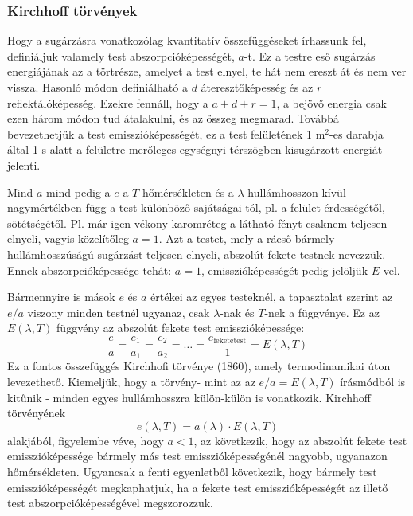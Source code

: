 \documentclass[../main.tex]{subfiles}
\begin{document}
\subsubsection{Kirchhoff törvények}
Hogy a sugárzásra vonatkozólag kvantitatív összefüggéseket írhassunk fel, definiáljuk valamely test abszorpcióképességét, $a$-t. Ez a testre eső sugárzás energiájának az a törtrésze, amelyet a test elnyel, te hát nem ereszt át és nem
ver vissza. Hasonló módon definiálható a $d$ áteresztőképesség és az $r$ reflektálóképesség. Ezekre fennáll, hogy a $a + d + r = 1$, a bejövő energia csak ezen
három módon tud átalakulni, és az összeg megmarad. Továbbá bevezethetjük a test emisszióképességét, ez a test felületének 1 m$^2$-es darabja által
1 s alatt a felületre merőleges egységnyi térszögben kisugárzott energiát jelenti.

Mind $a$ mind pedig a $e$ a $T$ hőmérsékleten és a $\lambda$ hullámhosszon kívül nagymértékben függ a test különböző sajátságai tól, pl. a felület érdességétől, sötétségétől. Pl. már igen vékony karomréteg a látható fényt csaknem teljesen elnyeli, vagyis közelítőleg $a = 1$. Azt a testet, mely a ráeső bármely
hullámhosszúságú sugárzást teljesen elnyeli, abszolút fekete testnek nevezzük. Ennek abszorpcióképessége tehát: $a = 1$, emisszióképességét pedig jelöljük $E$-vel.

Bármennyire is mások $e$ és $a$ értékei az egyes testeknél, a tapasztalat szerint az $e/a$ viszony minden testnél ugyanaz, csak $\lambda$-nak és $T$-nek a függvénye. Ez az $E(\lambda, T)$ függvény az abszolút fekete test emisszióképessége:
\begin{equation}
    \frac{e}{a} = \frac{e_1}{a_1} = \frac{e_2}{a_2} = \ldots = \frac{e_{\text{feketetest}}}{1} = E(\lambda, T)
\end{equation}
Ez a fontos összefüggés Kirchhofi törvénye (1860), amely termodinamikai úton levezethető. Kiemeljük, hogy a törvény- mint az az $e/a= E(\lambda, T)$
írásmódból is kitűnik - minden egyes hullámhosszra külön-külön is vonatkozik. Kirchhoff törvényének
\begin{equation}
    e(\lambda, T) = a(\lambda) \cdot E(\lambda, T)
\end{equation}
alakjából, figyelembe véve, hogy $a < 1$, az következik, hogy az abszolút fekete test emisszióképessége bármely más test emisszióképességénél nagyobb,
ugyanazon hőmérsékleten. Ugyancsak a fenti egyenletből következik, hogy bármely test emisszióképességét megkaphatjuk, ha a fekete test emisszióképességét az illető test abszorpcióképességével megszorozzuk.
\end{document}
